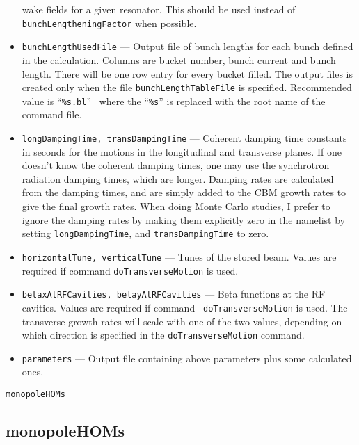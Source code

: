\documentclass[11pt]{article}
\begin{document}
\begin{itemize}
      wake fields for a given resonator. This should be used instead of
      {\tt bunchLengtheningFactor} when possible.
\item {\tt bunchLengthUsedFile} --- Output file of bunch lengths for each
      bunch defined in the calculation. Columns are bucket number, bunch current and 
      bunch length. There will be one row entry for every
      bucket filled. The output files is created only when
      the file {\tt bunchLengthTableFile} is specified. Recommended value is ``{\tt \%s.bl}'' \
      where the ``{\tt \%s}'' is replaced with the root name of the command file.
\item {\tt longDampingTime, transDampingTime} --- Coherent damping
      time constants in seconds for the motions in the longitudinal
      and transverse planes.  If one doesn't know the coherent damping
      times, one may use the synchrotron radiation damping times,
      which are longer. Damping rates are calculated from the damping
      times, and are simply added to the CBM growth rates to give the
      final growth rates.  When doing Monte Carlo studies, I prefer to
      ignore the damping rates by making them explicitly zero in the namelist
      by setting {\tt longDampingTime}, and {\tt transDampingTime} to
      zero.
\item {\tt horizontalTune, verticalTune} --- Tunes of the stored
      beam. Values are required if command {\tt doTransverseMotion} is
      used.
\item {\tt betaxAtRFCavities, betayAtRFCavities} --- Beta functions at
      the RF cavities.  Values are required if command {\tt
      doTransverseMotion} is used.  The transverse growth
      rates will scale with one of the two values, depending on which
      direction is specified in the {\tt doTransverseMotion} command.
\item {\tt parameters} --- Output file containing above parameters
      plus some calculated ones.
\end{itemize}

\newpage
\begin{center}{\tt monopoleHOMs}\end{center}
\subsection{monopoleHOMs}
\end{document}
